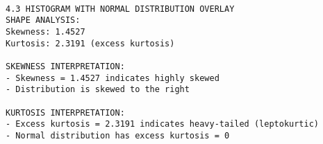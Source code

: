 \documentclass[8pt, twocolumn]{extarticle}
\begin{document}
    \centering
    \begin{Verbatim}[commandchars=\\\{\}]

4.3 HISTOGRAM WITH NORMAL DISTRIBUTION OVERLAY
SHAPE ANALYSIS:
Skewness: 1.4527
Kurtosis: 2.3191 (excess kurtosis)

SKEWNESS INTERPRETATION:
- Skewness = 1.4527 indicates highly skewed
- Distribution is skewed to the right

KURTOSIS INTERPRETATION:
- Excess kurtosis = 2.3191 indicates heavy-tailed (leptokurtic)
- Normal distribution has excess kurtosis = 0
    \end{Verbatim}
\end{document}
